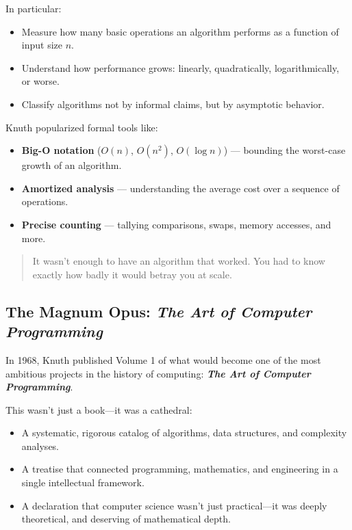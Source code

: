 In particular:

\begin{itemize}
    \item Measure how many basic operations an algorithm performs as a function of input size \( n \).
    \item Understand how performance grows: linearly, quadratically, logarithmically, or worse.
    \item Classify algorithms not by informal claims, but by asymptotic behavior.
\end{itemize}

Knuth popularized formal tools like:

\begin{itemize}
    \item \textbf{Big-O notation} (\( O(n) \), \( O(n^2) \), \( O(\log n) \)) — bounding the worst-case growth of an algorithm.
    \item \textbf{Amortized analysis} — understanding the average cost over a sequence of operations.
    \item \textbf{Precise counting} — tallying comparisons, swaps, memory accesses, and more.
\end{itemize}

\begin{quote}
It wasn’t enough to have an algorithm that worked.  
You had to know exactly how badly it would betray you at scale.
\end{quote}

\subsection{The Magnum Opus: \textit{The Art of Computer Programming}}

In 1968, Knuth published Volume 1 of what would become one of the most ambitious projects in the history of computing:  
\textbf{\textit{The Art of Computer Programming}}.

This wasn’t just a book—it was a cathedral:

\begin{itemize}
    \item A systematic, rigorous catalog of algorithms, data structures, and complexity analyses.
    \item A treatise that connected programming, mathematics, and engineering in a single intellectual framework.
    \item A declaration that computer science wasn’t just practical—it was deeply theoretical, and deserving of mathematical depth.
\end{itemize}

